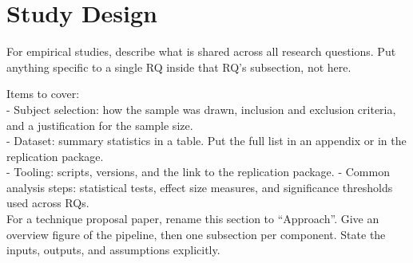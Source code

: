 \section{Study Design}

For empirical studies, describe what is shared across all research
questions. Put anything specific to a single RQ inside that RQ's
subsection, not here.

Items to cover:\\
  - Subject selection: how the sample was drawn, inclusion and exclusion
    criteria, and a justification for the sample size.\\
  - Dataset: summary statistics in a table. Put the full list in an
    appendix or in the replication package.\\
  - Tooling: scripts, versions, and the link to the replication package.
  - Common analysis steps: statistical tests, effect size measures, and
    significance thresholds used across RQs.\\

For a technique proposal paper, rename this section to ``Approach''. Give
an overview figure of the pipeline, then one subsection per component.
State the inputs, outputs, and assumptions explicitly.


\clearpage